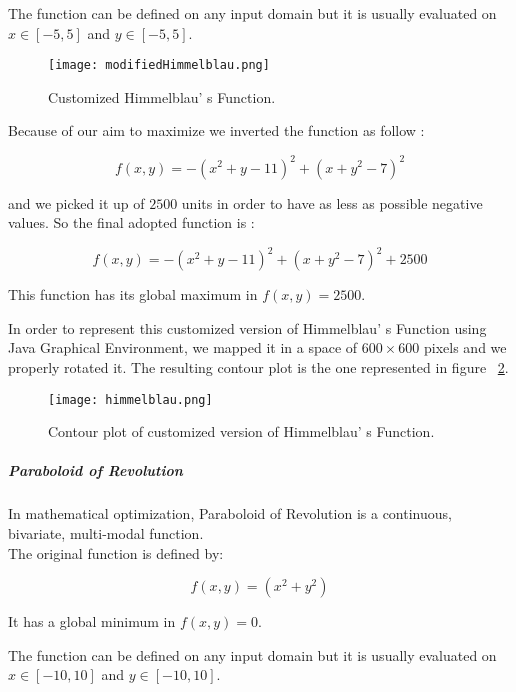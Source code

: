 The function can be defined on any input domain but it is usually evaluated on $x \in [-5, 5]$ and $y \in [-5, 5]$.

\begin{figure}[h!]
	\centering
	\texttt{[image: modifiedHimmelblau.png]}
	\caption{Customized Himmelblau' s Function.}
	\label{fig:CustomizedHimmelblauFunction}
\end{figure}

Because of our aim to maximize we inverted the function as follow :

\begin{equation}
f(x, y) = -(x^2 + y -11)^2 + (x + y^2 - 7)^2
\end{equation}

and we picked it up of $2500$ units in order to have as less as possible negative values. So the final adopted function is :
 
\begin{equation}
f(x, y) = -(x^2 + y -11)^2 + (x + y^2 - 7)^2 + 2500
\end{equation}

This function has its global maximum in $f(x, y) = 2500$. 

In order to represent this customized version of Himmelblau' s Function using Java Graphical Environment, we mapped it in a space of $600 \times 600$ pixels and we properly rotated it. The resulting contour plot is the one represented in figure ~\ref{fig:ContourPlotCustomizedHimmelblauFunction}. \\

\begin{figure}[h!]
	\centering
	\texttt{[image: himmelblau.png]}
	\caption{Contour plot of customized version of Himmelblau' s Function.}
	\label{fig:ContourPlotCustomizedHimmelblauFunction}
\end{figure}
 
\subparagraph{Paraboloid of Revolution} In mathematical optimization, Paraboloid of Revolution is a continuous, bivariate, multi-modal function. \\

The original function is defined by: 

\begin{equation}
f(x, y) = (x^2 + y^2) 
\end{equation}

It has a global minimum in $f(x, y) = 0$.

The function can be defined on any input domain but it is usually evaluated on $x \in [-10, 10]$ and $y \in [-10, 10]$. 

